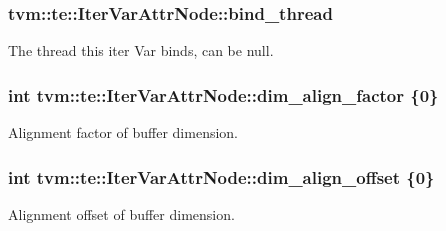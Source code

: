 \subsubsection[{\texorpdfstring{bind\+\_\+thread}{bind_thread}}]{ tvm\+::te\+::\+Iter\+Var\+Attr\+Node\+::bind\+\_\+thread}\hypertarget{classtvm_1_1te_1_1IterVarAttrNode_a8bd9e6a5cf8ce894eddee84a8cc98bfd}{}\label{classtvm_1_1te_1_1IterVarAttrNode_a8bd9e6a5cf8ce894eddee84a8cc98bfd}


The thread this iter Var binds, can be null. 

\subsubsection[{\texorpdfstring{dim\+\_\+align\+\_\+factor}{dim_align_factor}}]{\setlength{\rightskip}{0pt plus 5cm}int tvm\+::te\+::\+Iter\+Var\+Attr\+Node\+::dim\+\_\+align\+\_\+factor \{0\}}\hypertarget{classtvm_1_1te_1_1IterVarAttrNode_a8d3c51e9b50ef1d3e10453b3210d187a}{}\label{classtvm_1_1te_1_1IterVarAttrNode_a8d3c51e9b50ef1d3e10453b3210d187a}


Alignment factor of buffer dimension. 

\subsubsection[{\texorpdfstring{dim\+\_\+align\+\_\+offset}{dim_align_offset}}]{\setlength{\rightskip}{0pt plus 5cm}int tvm\+::te\+::\+Iter\+Var\+Attr\+Node\+::dim\+\_\+align\+\_\+offset \{0\}}\hypertarget{classtvm_1_1te_1_1IterVarAttrNode_aa75bbe1b6c521352553752261a1b6f50}{}\label{classtvm_1_1te_1_1IterVarAttrNode_aa75bbe1b6c521352553752261a1b6f50}


Alignment offset of buffer dimension. 

